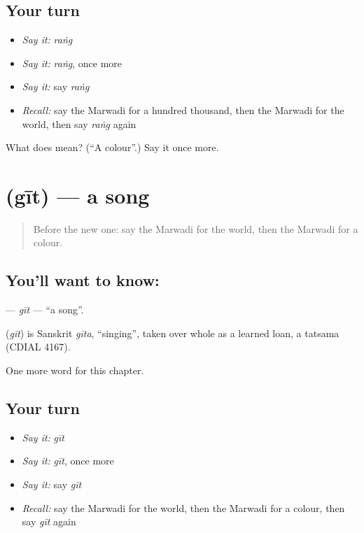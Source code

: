 \subsection*{Your turn}
\begin{itemize}
\raggedright
  \item \emph{Say it:} \emph{raṅg}
  \item \emph{Say it:} \emph{raṅg}, once more
  \item \emph{Say it:} say \emph{raṅg}
  \item \emph{Recall:} say the Marwadi for a hundred thousand, then the Marwadi for the world, then say \emph{raṅg} again
\end{itemize}

\begin{tcolorbox}[breakable,colback=teal!4,colframe=teal!35!black,title={Before you move on}]
What does  mean? (\textquotedblleft{}A colour\textquotedblright{}.) Say it once more.
\end{tcolorbox}
\section[\texorpdfstring{\mw{गीत} (gīt)}{गीत (gīt)}]{ (gīt) — a song}

\label{lesson:MW-C88-git}



\begin{quote}
Before the new one: say the Marwadi for the world, then the Marwadi for a colour.
\end{quote}

\subsection*{You'll want to know: }
\textbf{} — \emph{gīt} — \textquotedblleft{}a song\textquotedblright{}.

\begin{cousinweb}
\textbf{} (\emph{gīt}) is Sanskrit \emph{gīta}, \textquotedblleft{}singing\textquotedblright{}, taken over whole as a learned loan, a tatsama (CDIAL 4167).
\end{cousinweb}

\begin{grammarlens}[title={What you've built}]
One more word for this chapter.
\end{grammarlens}

\subsection*{Your turn}
\begin{itemize}
\raggedright
  \item \emph{Say it:} \emph{gīt}
  \item \emph{Say it:} \emph{gīt}, once more
  \item \emph{Say it:} say \emph{gīt}
  \item \emph{Recall:} say the Marwadi for the world, then the Marwadi for a colour, then say \emph{gīt} again
\end{itemize}


